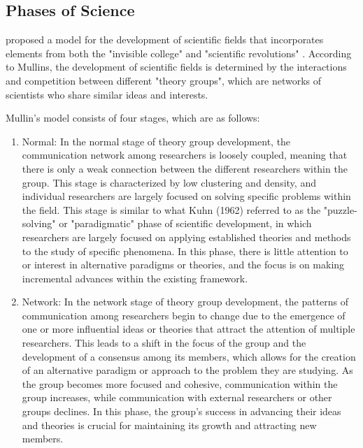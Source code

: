 \subsection{Phases of Science}

\cite{mullins1973} proposed a model for the development of scientific fields that incorporates elements from both the "invisible college" \citep{desollaprice1966, crane1969, crane1972, paisley1972} and "scientific revolutions" \citep{kuhn2012}. According to Mullins, the development of scientific fields is determined by the interactions and competition between different "theory groups", which are networks of scientists who share similar ideas and interests.

Mullin's model consists of four stages, which are as follows:

\begin{enumerate}

\item Normal: In the normal stage of theory group development, the communication network among researchers is loosely coupled, meaning that there is only a weak connection between the different researchers within the group. This stage is characterized by low clustering and density, and individual researchers are largely focused on solving specific problems within the field. This stage is similar to what Kuhn (1962) referred to as the "puzzle-solving" or "paradigmatic" phase of scientific development, in which researchers are largely focused on applying established theories and methods to the study of specific phenomena. In this phase, there is little attention to or interest in alternative paradigms or theories, and the focus is on making incremental advances within the existing framework.

\item Network: In the network stage of theory group development, the patterns of communication among researchers begin to change due to the emergence of one or more influential ideas or theories that attract the attention of multiple researchers. This leads to a shift in the focus of the group and the development of a consensus among its members, which allows for the creation of an alternative paradigm or approach to the problem they are studying. As the group becomes more focused and cohesive, communication within the group increases, while communication with external researchers or other groups declines. In this phase, the group's success in advancing their ideas and theories is crucial for maintaining its growth and attracting new members.


\end{enumerate}
